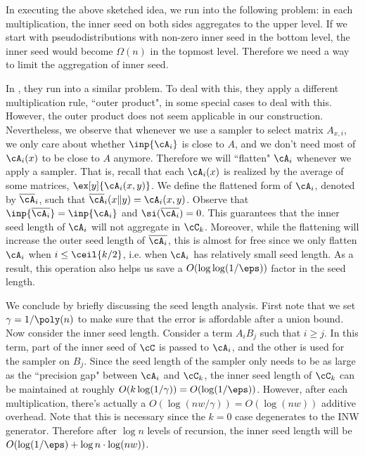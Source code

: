 In executing the above sketched idea, we run into the following problem: in each multiplication, the inner seed on both sides  aggregates to the upper level. If we start with pseudodistributions with non-zero inner seed in the bottom level, the inner seed would become $\Omega(n)$ in the topmost level. Therefore we need a way to limit the aggregation of inner seed.

In \cite{BCG18}, they run into a similar problem. To deal with this,  they apply a different multiplication rule, ``outer product", in some special cases to deal with this. However, the outer product does not seem applicable in our construction. Nevertheless, we observe that whenever we use a sampler to select matrix $A_{x,i}$, we only care about whether $\inp{\cA_i}$ is close to $A$, and we don't need most of $\cA_i(x)$ to be close to $A$ anymore. Therefore we will ``flatten" $\cA_i$ whenever we apply a sampler. That is, recall that each $\cA_i(x)$ is realized by the average of some matrices, $\ex[y]{\cA_i(x,y)}$. We define the flattened form of $\cA_i$, denoted by $\overline{\cA}_i$, such that $\overline{\cA}_i(x\Vert y)=\cA_i(x,y)$. Observe that $\inp{\overline{\cA_i}}=\inp{\cA_i}$ and $\si(\overline{\cA_i})=0$. This guarantees that the inner seed length of $\cA_i$ will not aggregate in $\cC_k$. Moreover, while the flattening will increase the outer seed length of $\overline{\cA_i}$, this is almost for free since we only flatten $\cA_i$ when $i\le\ceil{k/2}$, i.e. when $\cA_i$ has relatively small seed length. As a result, this operation also helps us save a $O(\log\log(1/\eps))$ factor in the seed length.

We  conclude by briefly discussing the seed length analysis. First note that we set $\gamma=1/\poly(n)$ to make sure that the error is affordable after a union bound. Now consider the inner seed length. Consider a term $A_iB_j$ such that $i\ge j$. In this term, part of the inner seed of $\cC$ is passed to $\cA_i$, and the other is used for the sampler on $B_j$. Since the seed length of the sampler only needs to be as large as the ``precision gap" between $\cA_i$ and $\cC_k$, the inner seed length of $\cC_k$ can be maintained at roughly $O(k\log(1/\gamma))=O(\log(1/\eps))$. However, after each multiplication, there's actually a $O(\log (nw/\gamma))=O(\log (nw))$ additive overhead. Note that this is necessary since the $k=0$ case degenerates to the INW generator. Therefore after $\log n$ levels of recursion, the inner seed length will be $O(\log(1/\eps)+\log n\cdot \log (nw))$. 

